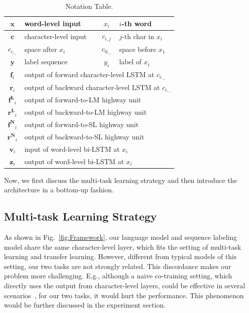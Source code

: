 \documentclass[letterpaper]{article} %
\def \myspace {\_}
\def \c {\mathbf{c}}
\def \f {\mathbf{f}}
\def \r {\mathbf{r}}
\def \v {\mathbf{v}}
\def \x {\mathbf{x}}
\def \y {\mathbf{y}}
\def \z {\mathbf{z}}
\def \fl {\mathbf{f^{L}}}
\def \fw {\mathbf{f^{N}}}
\def \rl {\mathbf{r^{L}}}
\def \rw {\mathbf{r^{N}}}
\begin{document}
\begin{table}[t]
\center
\begin{tabular}{c|l|c|l}
\hline
$\x$ & word-level input & $x_i$ & $i$-th word \\
\hline
$\c$ & character-level input & $c_{i,j}$ & $j$-th char in $x_i$ \\
\hline
$c_{i, \myspace}$ & space after $x_i$ & $c_{0, \myspace}$ & space before $x_1$\\
\hline
$\y$ & label sequence & $y_i$ & label of $x_i$ \\
\hline
$\f_i$ & \multicolumn{3}{l}{output of forward character-level LSTM at $c_{i, \myspace}$}\\
\hline
$\r_i$ & \multicolumn{3}{l}{output of backward character-level LSTM at $c_{i, \myspace}$}\\
\hline
$\fl_i$ & \multicolumn{3}{l}{output of forward-to-LM highway unit}\\
\hline
$\rl_i$ & \multicolumn{3}{l}{output of backward-to-LM highway unit}\\
\hline
$\fw_i$ & \multicolumn{3}{l}{output of forward-to-SL highway unit}\\
\hline
$\rw_i$ & \multicolumn{3}{l}{output of backward-to-SL highway unit}\\
\hline
$\v_i$ & \multicolumn{3}{l}{input of word-level bi-LSTM at $x_i$}\\
\hline
$\z_i$ & \multicolumn{3}{l}{output of word-level bi-LSTM at $x_i$}\\
\hline
\end{tabular}
\caption{Notation Table.}\label{tbl:notation}
\end{table}


Now, we first discuss the multi-task learning strategy and then introduce the architecture in a bottom-up fashion.

\subsection{Multi-task Learning Strategy}
As shown in Fig.~\ref{fig:Framework}, our language model and sequence labeling model share the same character-level layer, which fits the setting of multi-task learning and transfer learning.
However, different from typical models of this setting, our two tasks are not strongly related.
This discordance makes our problem more challenging.
E.g., although a naive co-training setting, which directly uses the output from character-level layers, could be effective in several scenarios~\cite{yang2017transfer},
for our two tasks, it would hurt the performance.
This phenomenon would be further discussed in the experiment section.
\end{document}
